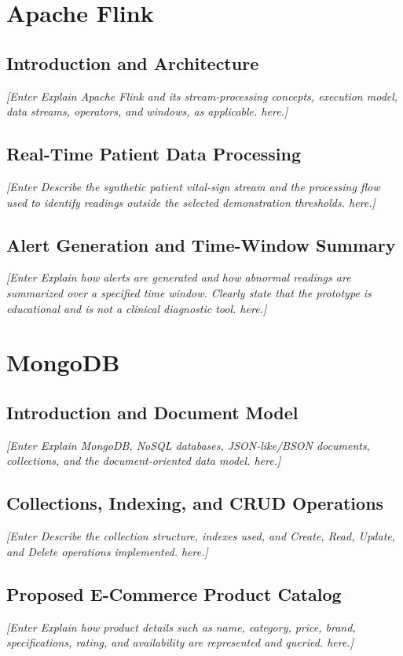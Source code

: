 \documentclass[12pt,a4paper]{report}
\newcommand{\placeholder}[1]{\textit{[Enter #1 here.]}}
\begin{document}
\section{Apache Flink}
\subsection{Introduction and Architecture}
\placeholder{Explain Apache Flink and its stream-processing concepts,
execution model, data streams, operators, and windows, as applicable.}

\subsection{Real-Time Patient Data Processing}
\placeholder{Describe the synthetic patient vital-sign stream and the
processing flow used to identify readings outside the selected
demonstration thresholds.}

\subsection{Alert Generation and Time-Window Summary}
\placeholder{Explain how alerts are generated and how abnormal readings
are summarized over a specified time window. Clearly state that the
prototype is educational and is not a clinical diagnostic tool.}

\section{MongoDB}
\subsection{Introduction and Document Model}
\placeholder{Explain MongoDB, NoSQL databases, JSON-like/BSON documents,
collections, and the document-oriented data model.}

\subsection{Collections, Indexing, and CRUD Operations}
\placeholder{Describe the collection structure, indexes used, and
Create, Read, Update, and Delete operations implemented.}

\subsection{Proposed E-Commerce Product Catalog}
\placeholder{Explain how product details such as name, category, price,
brand, specifications, rating, and availability are represented and
queried.}
\end{document}
